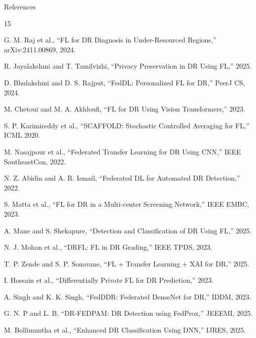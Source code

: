 \documentclass[aspectratio=169, 11pt]{beamer}
\begin{document}
\begin{frame}[allowframebreaks]{References}
\footnotesize
\begin{thebibliography}{15}

 G. M. Raj et al., ``FL for DR Diagnosis in Under-Resourced Regions,'' arXiv:2411.00869, 2024.

 R. Jayalakshmi and T. Tamilvizhi, ``Privacy Preservation in DR Using FL,'' 2025.

 D. Bhulakshmi and D. S. Rajput, ``FedDL: Personalized FL for DR,'' PeerJ CS, 2024.

 M. Chetoui and M. A. Akhloufi, ``FL for DR Using Vision Transformers,'' 2023.

 S. P. Karimireddy et al., ``SCAFFOLD: Stochastic Controlled Averaging for FL,'' ICML 2020.

 M. Nasajpour et al., ``Federated Transfer Learning for DR Using CNN,'' IEEE SoutheastCon, 2022.

 N. Z. Abidin and A. R. Ismail, ``Federated DL for Automated DR Detection,'' 2022.

 S. Matta et al., ``FL for DR in a Multi-center Screening Network,'' IEEE EMBC, 2023.

 A. Mane and S. Shekapure, ``Detection and Classification of DR Using FL,'' 2025.

 N. J. Mohan et al., ``DRFL: FL in DR Grading,'' IEEE TPDS, 2023.

 T. P. Zende and S. P. Sonavane, ``FL + Transfer Learning + XAI for DR,'' 2025.

 I. Hossain et al., ``Differentially Private FL for DR Prediction,'' 2023.

 A. Singh and K. K. Singh, ``FedDDR: Federated DenseNet for DR,'' IDDM, 2023.

 G. N. P and L. B, ``DR-FEDPAM: DR Detection using FedProx,'' JEEEMI, 2025.

 M. Bollimuntha et al., ``Enhanced DR Classification Using DNN,'' IJRES, 2025.

\end{thebibliography}
\end{frame}
\end{document}
